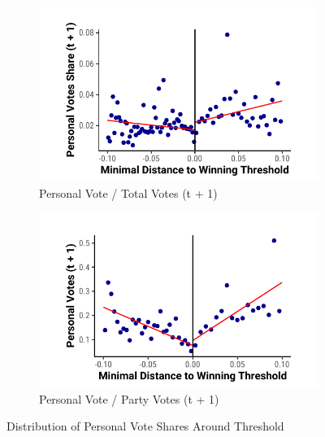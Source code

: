 \documentclass[12pt]{article}
\begin{document}
\begin{figure}[htbp]
    \centering
    \begin{subfigure}[t]{0.48\textwidth}
        \includegraphics[width = 1 \textwidth]{../output/figures/norway_pv_share.pdf}
        \caption{Personal Vote / Total Votes (t + 1)}
        \end{subfigure}%
        \begin{subfigure}[t]{0.48\textwidth}
        \includegraphics[width = 1 \textwidth]{../output/figures/norway_pv_share_p.pdf}
        \caption{Personal Vote / Party Votes (t + 1)}
        \end{subfigure}
    \caption{Distribution of Personal Vote Shares Around Threshold}
    \label{app:norway_pv_plot2}
\end{figure}


\end{document}
